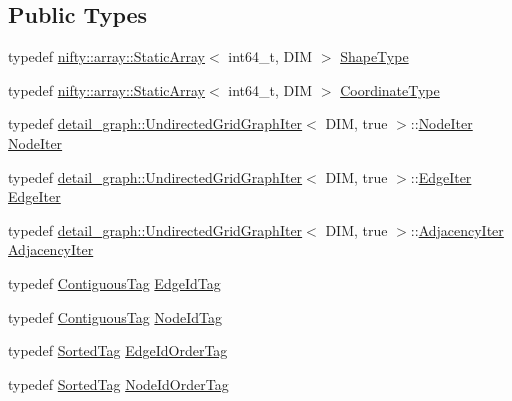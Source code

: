 \subsection*{Public Types}
\begin{DoxyCompactItemize}
\item 
typedef \hyperlink{namespacenifty_1_1array_a683f151f19c851754e0c6d55ed16a0c2}{nifty\+::array\+::\+Static\+Array}$<$ int64\+\_\+t, D\+I\+M $>$ \hyperlink{classnifty_1_1graph_1_1UndirectedGridGraph_3_01DIM_00_01true_01_4_abea92f7d305119d361e2189b00e495ba}{Shape\+Type}
\item 
typedef \hyperlink{namespacenifty_1_1array_a683f151f19c851754e0c6d55ed16a0c2}{nifty\+::array\+::\+Static\+Array}$<$ int64\+\_\+t, D\+I\+M $>$ \hyperlink{classnifty_1_1graph_1_1UndirectedGridGraph_3_01DIM_00_01true_01_4_a45f38cce72559c7bdefa3d219486bae4}{Coordinate\+Type}
\item 
typedef \hyperlink{classnifty_1_1graph_1_1detail__graph_1_1UndirectedGridGraphIter}{detail\+\_\+graph\+::\+Undirected\+Grid\+Graph\+Iter}$<$ D\+I\+M, true $>$\+::\hyperlink{classnifty_1_1graph_1_1UndirectedGridGraph_3_01DIM_00_01true_01_4_a977e01bd675cc7d454ce18417c6e0397}{Node\+Iter} \hyperlink{classnifty_1_1graph_1_1UndirectedGridGraph_3_01DIM_00_01true_01_4_a977e01bd675cc7d454ce18417c6e0397}{Node\+Iter}
\item 
typedef \hyperlink{classnifty_1_1graph_1_1detail__graph_1_1UndirectedGridGraphIter}{detail\+\_\+graph\+::\+Undirected\+Grid\+Graph\+Iter}$<$ D\+I\+M, true $>$\+::\hyperlink{classnifty_1_1graph_1_1UndirectedGridGraph_3_01DIM_00_01true_01_4_adc2fd416d91079b5450887b0c2c3cf05}{Edge\+Iter} \hyperlink{classnifty_1_1graph_1_1UndirectedGridGraph_3_01DIM_00_01true_01_4_adc2fd416d91079b5450887b0c2c3cf05}{Edge\+Iter}
\item 
typedef \hyperlink{classnifty_1_1graph_1_1detail__graph_1_1UndirectedGridGraphIter}{detail\+\_\+graph\+::\+Undirected\+Grid\+Graph\+Iter}$<$ D\+I\+M, true $>$\+::\hyperlink{classnifty_1_1graph_1_1UndirectedGridGraph_3_01DIM_00_01true_01_4_a9779969eb8762908d43eab3d9d3b17b1}{Adjacency\+Iter} \hyperlink{classnifty_1_1graph_1_1UndirectedGridGraph_3_01DIM_00_01true_01_4_a9779969eb8762908d43eab3d9d3b17b1}{Adjacency\+Iter}
\item 
typedef \hyperlink{structnifty_1_1graph_1_1ContiguousTag}{Contiguous\+Tag} \hyperlink{classnifty_1_1graph_1_1UndirectedGridGraph_3_01DIM_00_01true_01_4_a0d9a24c893bf3f5f0cd61873bb77dfe1}{Edge\+Id\+Tag}
\item 
typedef \hyperlink{structnifty_1_1graph_1_1ContiguousTag}{Contiguous\+Tag} \hyperlink{classnifty_1_1graph_1_1UndirectedGridGraph_3_01DIM_00_01true_01_4_a35ae15ae07ebf58ef26916b417fba878}{Node\+Id\+Tag}
\item 
typedef \hyperlink{structnifty_1_1graph_1_1SortedTag}{Sorted\+Tag} \hyperlink{classnifty_1_1graph_1_1UndirectedGridGraph_3_01DIM_00_01true_01_4_aca991599ad4c8532f2d07ed7bc507449}{Edge\+Id\+Order\+Tag}
\item 
typedef \hyperlink{structnifty_1_1graph_1_1SortedTag}{Sorted\+Tag} \hyperlink{classnifty_1_1graph_1_1UndirectedGridGraph_3_01DIM_00_01true_01_4_accf075c1b2a1820d15eea368562c93aa}{Node\+Id\+Order\+Tag}
\end{DoxyCompactItemize}
